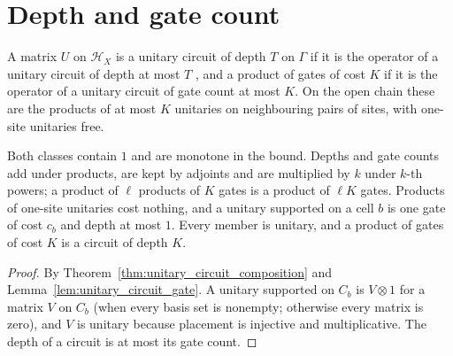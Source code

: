 \section{Depth and gate count}
\label{sec:unitary_classes}

\begin{definition}
    \label{def:unitary_classes}
    \leanok
    A matrix $U$ on $\mathcal H_X$ is a unitary circuit of depth $T$ on $\Gamma$ if it
    is the operator of a unitary circuit of depth at most $T$
    \cite{Malz2024Preparation, Piroli2021LOCC}, and a product of gates of cost $K$ if
    it is the operator of a unitary circuit of gate count at most $K$. On the open
    chain these are the products of at most $K$ unitaries on neighbouring pairs of
    sites, with one-site unitaries free.
\end{definition}

\begin{theorem}
    \label{thm:unitary_classes_closure}
    \leanok
    Both classes contain $1$ and are monotone in the bound. Depths and gate counts add
    under products, are kept by adjoints and are multiplied by $k$ under $k$-th
    powers; a product of $\ell$ products of $K$ gates is a product of $\ell K$ gates.
    Products of one-site unitaries cost nothing, and a unitary supported on a cell $b$
    is one gate of cost $c_b$ and depth at most $1$. Every member is unitary, and a
    product of gates of cost $K$ is a circuit of depth $K$.
\end{theorem}
\begin{proof}\leanok
    By Theorem~\ref{thm:unitary_circuit_composition} and
    Lemma~\ref{lem:unitary_circuit_gate}. A unitary supported on $C_b$ is $V\otimes1$ for
    a matrix $V$ on $C_b$ (when every basis set is nonempty; otherwise every matrix is
    zero), and $V$ is unitary because placement is injective and multiplicative. The
    depth of a circuit is at most its gate count.
\end{proof}


